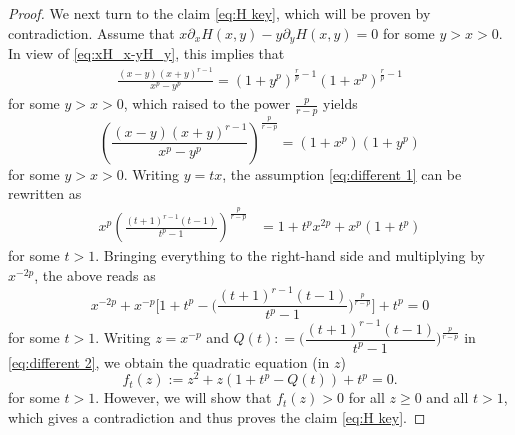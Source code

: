 \documentclass[reqno, 10pt]{amsart}
\theoremstyle{plain}
\numberwithin{equation}{section}
\theoremstyle{definition}
\newtheorem*{induction hypothesis}{Induction hypothesis}
\theoremstyle{remark}
\begin{document}
\begin{proof}
We next turn to the claim \eqref{eq:H key}, which will be proven by contradiction. Assume that $x \partial_x H(x,y)-y \partial_y H (x,y)=0$ for some $y>x>0$. In view of \eqref{eq:xH_x-yH_y}, this implies that 
\begin{align*}
     \frac{(x-y)(x+y)^{r-1}}{x^p - y^p} = (1+y^p)^{\frac{r}{p} - 1}(1+x^p)^{\frac{r}{p} - 1}
\end{align*}
for some $y > x >0$, which raised to the power $\frac{p}{r-p}$ yields 
\begin{equation}\label{eq:different 1}
    \left(\frac{(x-y)(x+y)^{r-1}}{x^p - y^p}\right)^\frac{p}{r-p} = (1+x^p)(1+y^p)
\end{equation}
for some $y> x>0$. Writing $y = tx$, the assumption \eqref{eq:different 1} can be rewritten as 
\begin{align*}
    x^p\left( \frac{ (t+1)^{r-1} (t-1)}{t^p - 1}\right)^\frac{p}{r-p} &= 1 + t^px^{2p} + x^p(1+t^p)
\end{align*}
for some $t>1$. 
Bringing everything to the right-hand side and multiplying by $x^{-2p}$, the above reads as
\begin{equation}\label{eq:different 2}
        x^{-2p} + x^{-p}\Big[1+t^p - \Big( \frac{ (t+1)^{r-1} (t-1)}{t^p - 1}\Big)^\frac{p}{r-p} \Big] + t^p =0
\end{equation}
for some $t>1$. Writing 
$z = x^{-p}$ and $Q(t): = \Big(\dfrac{ (t+1)^{r-1} (t-1)}{t^p - 1}\Big)^\frac{p}{r-p}$ in \eqref{eq:different 2}, we obtain the quadratic equation (in $z$)
\begin{equation*}%
    f_t(z):=z^2 + z(1+t^p - Q(t)) + t^p = 0.
\end{equation*}
for some $t>1$. However, we will show that  $f_t(z)>0$ for all $z \geq 0$ and all $t>1$, which gives a contradiction and thus proves the claim \eqref{eq:H key}. 



\end{proof}
\end{document}
